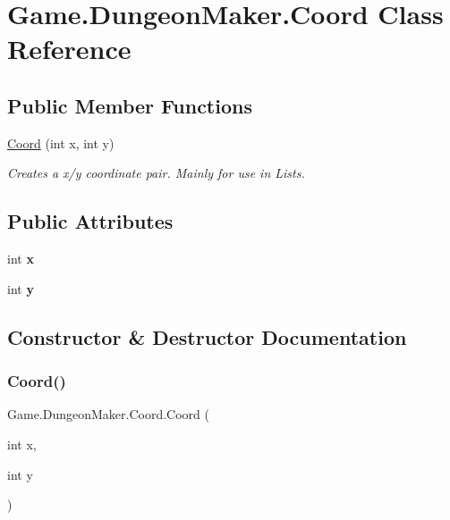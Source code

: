 \hypertarget{class_game_1_1_dungeon_maker_1_1_coord}{}\section{Game.\+Dungeon\+Maker.\+Coord Class Reference}
\label{class_game_1_1_dungeon_maker_1_1_coord}
\subsection*{Public Member Functions}
\begin{DoxyCompactItemize}
\item 
\mbox{\hyperlink{class_game_1_1_dungeon_maker_1_1_coord_ab8f7b0486b1be73445e2f004d8d75426}{Coord}} (int x, int y)
\begin{DoxyCompactList}\small\item\em Creates a x/y coordinate pair. Mainly for use in Lists. \end{DoxyCompactList}\end{DoxyCompactItemize}
\subsection*{Public Attributes}
\begin{DoxyCompactItemize}
\item 
\mbox{\label{class_game_1_1_dungeon_maker_1_1_coord_ae52fb2527e23cd0c695632fdcb9926ff}} 
int {\bfseries x}
\item 
\mbox{\label{class_game_1_1_dungeon_maker_1_1_coord_aa24f6d2ab099e02d19560bc69b5c0bdf}} 
int {\bfseries y}
\end{DoxyCompactItemize}


\subsection{Constructor \& Destructor Documentation}
\mbox{\label{class_game_1_1_dungeon_maker_1_1_coord_ab8f7b0486b1be73445e2f004d8d75426}} 
\subsubsection{\texorpdfstring{Coord()}{Coord()}}
{\footnotesize\ttfamily Game.\+Dungeon\+Maker.\+Coord.\+Coord (\begin{DoxyParamCaption}\item[{int}]{x,  }\item[{int}]{y }\end{DoxyParamCaption})}



